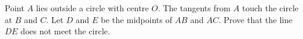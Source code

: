 Point $A$ lies outside a circle with centre $O$. The tangents from $A$ touch the circle at $B$ and $C$. Let $D$ and $E$ be the midpoints of $AB$ and $AC$. Prove that the line $DE$ does not meet the circle.
